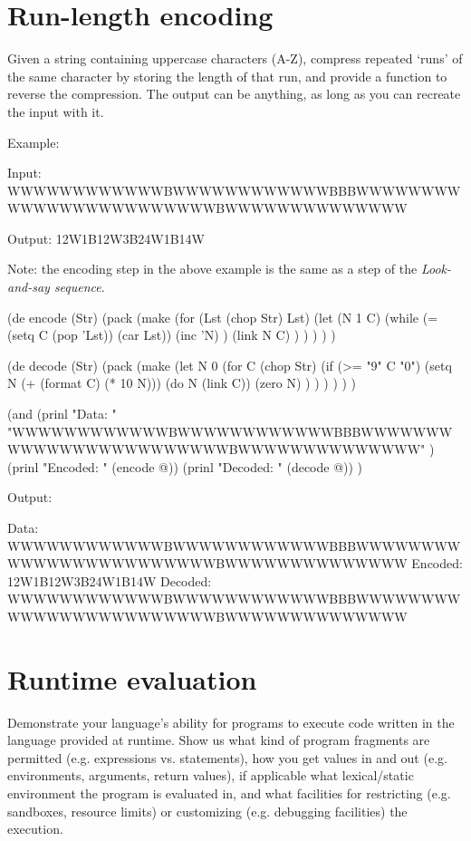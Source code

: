 \pagebreak{}
\section*{Run-length encoding}

Given a string containing uppercase characters (A-Z), compress repeated
`runs' of the same character by storing the length of that run, and
provide a function to reverse the compression. The output can be
anything, as long as you can recreate the input with it.

Example:

\begin{wideverbatim}
Input: WWWWWWWWWWWWBWWWWWWWWWWWWBBBWWWWWWWWWWWWWWWWWWWWWWWWBWWWWWWWWWWWWWW

Output: 12W1B12W3B24W1B14W
\end{wideverbatim}

Note: the encoding step in the above example is the same as a step of
the \emph{Look-and-say sequence}.


\begin{wideverbatim}

(de encode (Str)
   (pack
      (make
         (for (Lst (chop Str) Lst)
            (let (N 1  C)
               (while (= (setq C (pop 'Lst)) (car Lst))
                  (inc 'N) )
               (link N C) ) ) ) ) )

(de decode (Str)
   (pack
      (make
         (let N 0
            (for C (chop Str)
               (if (>= "9" C "0")
                  (setq N (+ (format C) (* 10 N)))
                  (do N (link C))
                  (zero N) ) ) ) ) ) )

(and
   (prinl "Data:    "
      "WWWWWWWWWWWWBWWWWWWWWWWWWBBBWWWWWWWWWWWWWWWWWWWWWWWWBWWWWWWWWWWWWWW" )
   (prinl "Encoded: " (encode @))
   (prinl "Decoded: " (decode @)) )

Output:

Data:    WWWWWWWWWWWWBWWWWWWWWWWWWBBBWWWWWWWWWWWWWWWWWWWWWWWWBWWWWWWWWWWWWWW
Encoded: 12W1B12W3B24W1B14W
Decoded: WWWWWWWWWWWWBWWWWWWWWWWWWBBBWWWWWWWWWWWWWWWWWWWWWWWWBWWWWWWWWWWWWWW

\end{wideverbatim}

\pagebreak{}
\section*{Runtime evaluation}

Demonstrate your language's ability for programs to execute code written
in the language provided at runtime. Show us what kind of program
fragments are permitted (e.g. expressions vs. statements), how you get
values in and out (e.g. environments, arguments, return values), if
applicable what lexical/static environment the program is evaluated in,
and what facilities for restricting (e.g. sandboxes, resource limits) or
customizing (e.g. debugging facilities) the execution.

